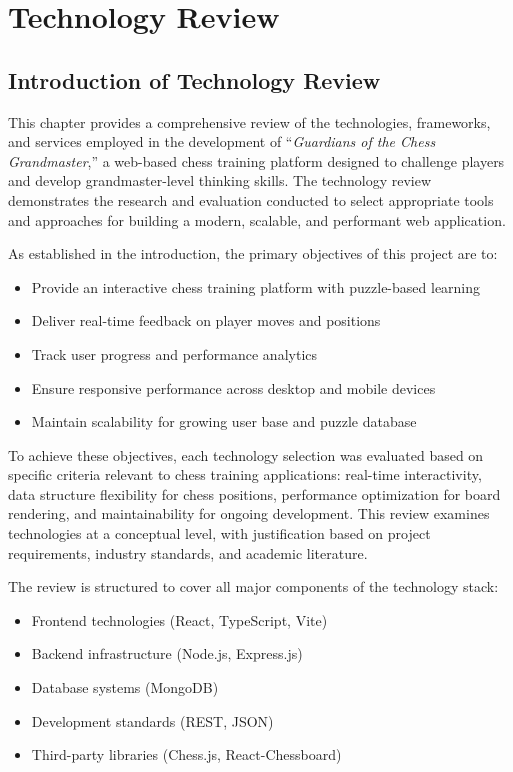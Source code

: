 \chapter{Technology Review}
\label{cha:review}

\section*{Introduction of Technology Review}

This chapter provides a comprehensive review of the technologies, frameworks, and services employed in the development of ``\textit{Guardians of the Chess Grandmaster},'' a web-based chess training platform designed to challenge players and develop grandmaster-level thinking skills. The technology review demonstrates the research and evaluation conducted to select appropriate tools and approaches for building a modern, scalable, and performant web application.

As established in the introduction, the primary objectives of this project are to:
\begin{itemize}
    \item Provide an interactive chess training platform with puzzle-based learning
    \item Deliver real-time feedback on player moves and positions
    \item Track user progress and performance analytics
    \item Ensure responsive performance across desktop and mobile devices
    \item Maintain scalability for growing user base and puzzle database
\end{itemize}

To achieve these objectives, each technology selection was evaluated based on specific criteria relevant to chess training applications: real-time interactivity, data structure flexibility for chess positions, performance optimization for board rendering, and maintainability for ongoing development. This review examines technologies at a conceptual level, with justification based on project requirements, industry standards, and academic literature.

The review is structured to cover all major components of the technology stack:
\begin{itemize}
    \item Frontend technologies (React, TypeScript, Vite)
    \item Backend infrastructure (Node.js, Express.js)
    \item Database systems (MongoDB)
    \item Development standards (REST, JSON)
    \item Third-party libraries (Chess.js, React-Chessboard)
\end{itemize}

